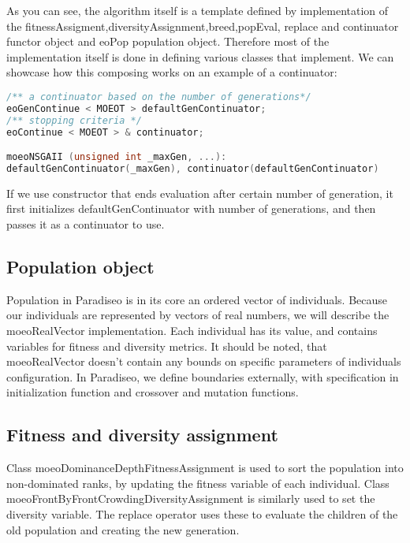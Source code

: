\documentclass[12pt,oneside]{fithesis2}
\begin{document}
As you can see, the algorithm itself is a template defined by implementation of the fitnessAssigment,diversityAssignment,breed,popEval, replace and continuator functor object and eoPop population object. Therefore most of the implementation itself is done in defining various classes that implement. We can showcase how this composing works on an example of a continuator:

\begin{lstlisting}[language=C++,label=composition,caption=Object composition in Paradiseo]
/** a continuator based on the number of generations*/
eoGenContinue < MOEOT > defaultGenContinuator;
/** stopping criteria */
eoContinue < MOEOT > & continuator;

moeoNSGAII (unsigned int _maxGen, ...):
defaultGenContinuator(_maxGen), continuator(defaultGenContinuator)
\end{lstlisting}

If we use constructor that ends evaluation after certain number of generation, it first initializes defaultGenContinuator with number of generations, and then passes it as a continuator to use. 

\subsection{Population object}
Population in Paradiseo is in its core an ordered vector of individuals. Because our individuals are represented by vectors of real numbers, we will describe the moeoRealVector implementation. Each individual has its value, and contains variables for fitness and diversity metrics. It should be noted, that moeoRealVector doesn't contain any bounds on specific parameters of individuals configuration. In Paradiseo, we define boundaries externally, with specification in initialization function and crossover and mutation functions. 

\subsection{Fitness and diversity assignment}

Class moeoDominanceDepthFitnessAssignment is used to sort the population into non-dominated ranks, by updating the fitness variable of each individual. Class moeoFrontByFrontCrowdingDiversityAssignment is similarly used to set the diversity variable. The replace operator uses these to evaluate the children of the old population and creating the new generation.
\end{document}
